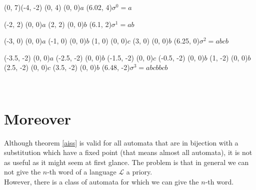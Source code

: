 \documentclass{article}
\begin{document}
\begin{graph}(0, 7)(-4, -2)
  (0, 4) (0, 0){$a$} %
  \freetext(6.02, 4){$\sigma^0 = a$}

  (-2, 2)  (0, 0){$a$} %
  (2, 2)  (0, 0){$b$}
  \freetext(6.1, 2){$\sigma^1 = ab$}

  (-3, 0)  (0, 0){$a$} %
  (-1, 0)  (0, 0){$b$}
  (1, 0)  (0, 0){$c$}
  (3, 0)  (0, 0){$b$}
  \freetext(6.25, 0){$\sigma^2 = abcb$}

  (-3.5, -2)  (0, 0){$a$} %
  (-2.5, -2)  (0, 0){$b$}
  (-1.5, -2) (0, 0){$c$}
  (-0.5, -2)  (0, 0){$b$}
  (1, -2)  (0, 0){$b$}
  (2.5, -2)  (0, 0){$c$}
  (3.5, -2)  (0, 0){$b$}
  \freetext(6.48, -2){$\sigma^3 = abcbbcb$}

   
   
  
   
   
   
   

   
   
   
   
   
   
   
\end{graph}\\

\section{Moreover}
Although theorem \ref{aiss} is valid for all automata that are in bijection 
with a substitution which have a fixed point (that means almost all automata), 
it is not as useful as it might seem at first glance. The problem is that in
general we can not give the $n$-th word of a language $\mathcal{L}$ a priory.\\
However, there is a class of automata for which we can give the $n$-th word. 
\end{document}
